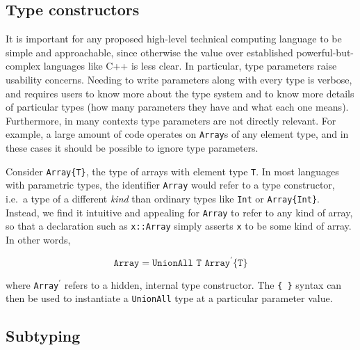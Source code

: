 \subsection{Type constructors}

It is important for any proposed high-level technical computing language to be
simple and approachable, since otherwise the value over established
powerful-but-complex languages like C++ is less clear.
In particular, type parameters raise usability concerns.
Needing to write parameters along with every type is verbose, and requires users
to know more about the type system and to know more details of particular
types (how many parameters they have and what each one means).
Furthermore, in many contexts type parameters are not directly relevant.
For example, a large amount of code operates on \texttt{Array}s of any
element type, and in these cases it should be possible to ignore type parameters.

Consider \texttt{Array\{T\}}, the type of arrays with element type \texttt{T}.
In most languages with parametric types, the identifier \texttt{Array} would
refer to a type constructor, i.e.\ a type of a different \emph{kind} than
ordinary types like \texttt{Int} or \texttt{Array\{Int\}}.
Instead, we find it intuitive and appealing for \texttt{Array} to refer to
any kind of array, so that a declaration such as \texttt{x::Array} simply
asserts \texttt{x} to be some kind of array.
In other words,

\vspace{-3ex}
\[
\texttt{Array} = \texttt{UnionAll T Array$^\prime$\{T\}}
\]

\noindent
where \texttt{Array$^\prime$} refers to a hidden, internal type constructor.
The \texttt{\{ \}} syntax can then be used to instantiate a \texttt{UnionAll}
type at a particular parameter value.


\subsection{Subtyping}

